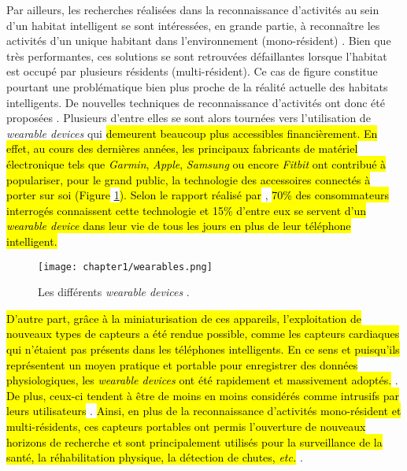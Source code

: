 {{Par ailleurs, les recherches réalisées dans la reconnaissance d'activités au sein d'un habitat intelligent se sont intéressées, en grande partie, à reconnaître les activités d'un unique habitant dans l'environnement (mono-résident) \citep{VikramadityaJakkula2007, VanKasteren2008, Inomata2009, Ghazvininejad2011, Belley2014, Fortin-Simard2015}. Bien que très performantes, ces solutions se sont retrouvées défaillantes lorsque l'habitat est occupé par plusieurs résidents (multi-résident). Ce cas de figure constitue pourtant une problématique bien plus proche de la réalité actuelle des habitats intelligents. De nouvelles techniques de reconnaissance d'activités ont donc été proposées \citep{Crandall2009, Cook2009, Alemdar2013, Ayuningtyas2014, Emi2015, Mokhtari2018}. Plusieurs d'entre elles \citep{Mihailidis2004, Tunca2014} se sont alors tournées vers l'utilisation de \textit{wearable devices} qui \hl{demeurent beaucoup plus accessibles financièrement. En effet, au cours des dernières années, les principaux fabricants de matériel électronique tels que \textit{Garmin}, \textit{Apple}, \textit{Samsung} ou encore \textit{Fitbit} ont contribué à populariser, pour le grand public, la technologie des accessoires connectés à porter sur soi (Figure} \ref{fig:wearables}\hl{). Selon le rapport réalisé par} \cite{Nielsen2014}, \hl{70\% des consommateurs interrogés connaissent cette technologie et 15\% d'entre eux se servent d'un \textit{wearable device} dans leur vie de tous les jours en plus de leur téléphone intelligent.}

\begin{figure}[H]
	\centering
	\texttt{[image: chapter1/wearables.png]}
	\caption[Les différents \textit{wearable devices}.]{Les différents \textit{wearable devices} \citep{Huifeng2020}.}
	\label{fig:wearables}
\end{figure}

\hl{D'autre part, grâce à la miniaturisation de ces appareils, l'exploitation de nouveaux types de capteurs a été rendue possible, comme les capteurs cardiaques qui n'étaient pas présents dans les téléphones intelligents. En ce sens et puisqu'ils représentent un moyen pratique et portable pour enregistrer des données physiologiques, les \textit{wearable devices} ont été rapidement et massivement adoptés.} \citep{NPDGroup2015}. \hl{De plus, ceux-ci tendent à être de moins en moins considérés comme intrusifs par leurs utilisateurs} \citep{Gaskin2017}. \hl{Ainsi, en plus de la reconnaissance d'activités mono-résident et multi-résidents, ces capteurs portables ont permis l'ouverture de nouveaux horizons de recherche et sont principalement utilisés pour la surveillance de la santé, la réhabilitation physique, la détection de chutes, \textit{etc.}} \citep{Patel2012, Mukhopadhyay2014, Delahoz2014}.

}}
